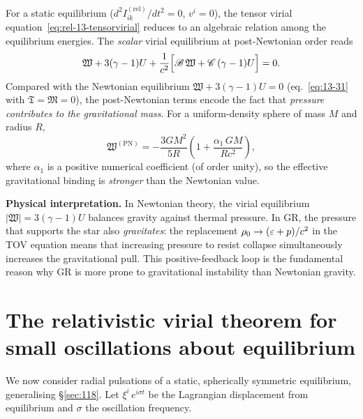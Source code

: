 For a static equilibrium ($d^{2}I_{ik}^{(\mathrm{rel})}/dt^{2}=0$,
$v^{i}=0$), the tensor virial equation~\eqref{eq:rel-13-tensorvirial}
reduces to an algebraic relation among the equilibrium energies.
The \emph{scalar} virial equilibrium at post-Newtonian order reads
\begin{equation}
\label{eq:rel-13-PN-equil}
\mathfrak{W} + 3(\gamma-1)U
  + \frac{1}{c^{2}}\Bigl[
      \mathscr{B}\,\mathfrak{W}
    + \mathscr{C}\,(\gamma-1)U
    \Bigr] = 0.
\end{equation}
Compared with the Newtonian equilibrium
$\mathfrak{W} + 3(\gamma-1)U = 0$ (eq.~\eqref{eq:13-31} with
$\mathfrak{T}=\mathfrak{M}=0$), the post-Newtonian terms encode the
fact that \emph{pressure contributes to the gravitational mass}.  For a
uniform-density sphere of mass $M$ and radius $R$,
\begin{equation}
\label{eq:rel-13-WPN-sphere}
\mathfrak{W}^{(\mathrm{PN})}
  = -\frac{3GM^{2}}{5R}\left(
      1 + \frac{\alpha_{1}\,GM}{Rc^{2}}
    \right),
\end{equation}
where $\alpha_{1}$ is a positive numerical coefficient (of order
unity), so the effective gravitational binding is \emph{stronger}
than the Newtonian value.

\begin{relcorrection}
\textbf{Physical interpretation.}
In Newtonian theory, the virial equilibrium
$|\mathfrak{W}| = 3(\gamma-1)U$ balances gravity against thermal
pressure.  In GR, the pressure that supports the star also
\emph{gravitates}: the replacement
$\rho_0 \to (\varepsilon + p)/c^{2}$ in the TOV equation means that
increasing pressure to resist collapse simultaneously increases the
gravitational pull.  This positive-feedback loop is the fundamental
reason why GR is more prone to gravitational instability than
Newtonian gravity.
\end{relcorrection}


\section{The relativistic virial theorem for small oscillations
  about equilibrium}
\label{sec:rel-118}

We now consider radial pulsations of a static, spherically symmetric
equilibrium, generalising \S\ref{sec:118}.  Let
$\xi^{i}\,e^{i\sigma t}$ be the Lagrangian displacement from
equilibrium and $\sigma$ the oscillation frequency.

